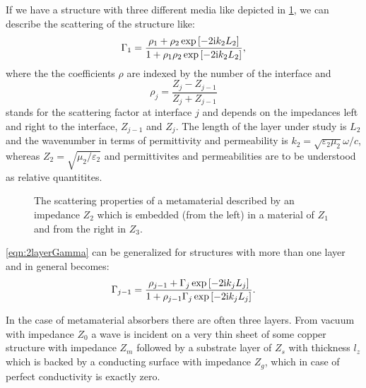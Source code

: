 If we have a structure with three different media like depicted in \cref{fig:stacked_structure}, we can describe the scattering of the structure like:
\begin{equation}
\Gamma_1 = \frac{\rho_1+\rho_2 \exp\left[-2\mathrm{i} k_2 L_2\right]}
{1+\rho_1\rho_2 \exp\left[-2\mathrm{i} k_2 L_2\right]},
\label{eqn:2layerGamma}
\end{equation}
where the the coefficients $\rho$ are indexed by the number of the interface and 
\begin{equation}
\rho_j = \frac{Z_j - Z_{j-1} }{Z_j + Z_{j-1} }
\label{eqn:rho}
\end{equation}
stands for the scattering factor at interface $j$ and depends on the impedances left and right to the interface, 
$Z_{j-1}$ and $Z_j$. The length of the layer under study is $L_2$ and the wavenumber in terms of permittivity 
and permeability is $k_2=\sqrt{\varepsilon_2\mu_2} \omega/c$, whereas $Z_2=\sqrt{\mu_2/\varepsilon_2}$ and permittivites and permeabilities are to be understood as relative quantitites.


\begin{figure}
\centering
{}
\caption{The scattering properties of a metamaterial described by an impedance $Z_2$ which is embedded (from the left) in a material of $Z_1$ and from the right in $Z_3$.}
\label{fig:stacked_structure}
\end{figure}

\cref{eqn:2layerGamma} can be generalized for structures with more than one layer and in general becomes:
\begin{equation}
\Gamma_{j-1} = \frac{\rho_{j-1}+\Gamma_j \exp\left[-2\mathrm{i} k_j L_j\right]}
{1+\rho_{j-1}\Gamma_j \exp\left[-2\mathrm{i} k_j L_j\right]}.
\label{eqn:NlayerGamma}
\end{equation}

In the case of metamaterial absorbers there are often three layers. From vacuum with impedance $Z_0$ a wave is incident on a very thin sheet of some copper structure with impedance $Z_m$ followed by a substrate layer of $Z_s$ with thickness $l_z$ which is backed by a conducting surface with impedance $Z_g$, which in case of perfect conductivity is exactly zero.

